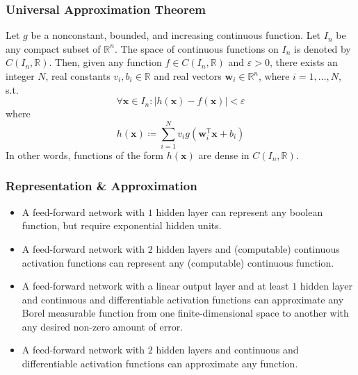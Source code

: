 \documentclass[UTF8,11pt,colorlinks,compress,openany]{beamer}%
\begin{document}
\begin{frame}\frametitle{Universal Approximation Theorem}
	\begin{theorem}
		Let $g$ be a nonconstant, bounded, and increasing continuous function. Let $I_n$ be any compact subset of $\mathbb{R}^n$. The space of continuous functions on $I_n$ is denoted by $C(I_n,\mathbb{R})$. Then, given any function $f\in C(I_n,\mathbb{R})$ and $\varepsilon>0$, there exists an integer $N$, real constants $v_i,b_i\in\mathbb{R}$ and real vectors $\mathbf{w}_i \in \mathbb{R}^n$, where $i=1,\dots,N$, s.t.
		\[\forall\mathbf{x}\in I_n: |h(\mathbf{x}) - f(\mathbf{x})| < \varepsilon\]
		where
		\[h(\mathbf{x})\coloneqq \sum\limits_{i=1}^{N} v_i g\left(\mathbf{w}_i^\mathsf{T}\mathbf{x} + b_i\right)\]
		In other words, functions of the form $h(\mathbf{x})$ are dense in $C(I_n,\mathbb{R})$.
	\end{theorem}
\end{frame}

\begin{frame}\frametitle{Representation \& Approximation}
	\begin{itemize}
		\item A feed-forward network with $1$ hidden layer can represent any boolean function, but require exponential hidden units.
		\item A feed-forward network with $2$ hidden layers and (computable) continuous activation functions can represent any (computable) continuous function.
		\item A feed-forward network with a linear output layer and at least $1$ hidden layer and continuous and differentiable activation functions can approximate any Borel measurable function from one finite-dimensional space to another with any desired non-zero amount of error.
		\item A feed-forward network with $2$ hidden layers and continuous and differentiable activation functions can approximate any function.
	\end{itemize}
\end{frame}
\end{document}
